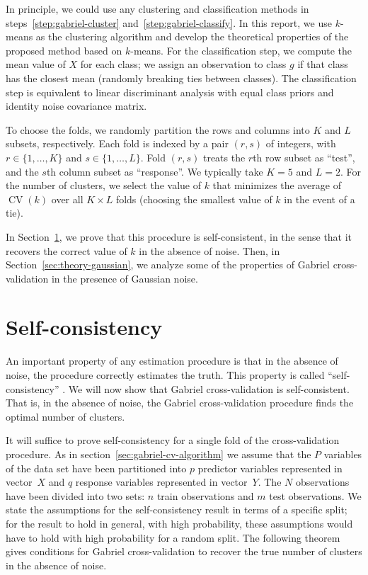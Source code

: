 \documentclass[12pt]{article}
\newcommand{\CV}{\operatorname{CV}}
\begin{document}
\noindent
In principle, we could use any clustering and classification methods in
steps~\ref{step:gabriel-cluster} and~\ref{step:gabriel-classify}.  In this
report, we use $k$-means \citep{hartigan1979algorithm} as the clustering algorithm 
and develop the theoretical properties of the proposed method based on $k$-means. 
For the classification step, we compute the mean value of $X$ for each class; we assign an
observation to class $g$ if that class has the closest mean (randomly breaking
ties between classes).  The classification step is equivalent to linear
discriminant analysis with equal class priors and identity noise covariance
matrix.


To choose the folds, we randomly partition the rows and columns into $K$ and
$L$ subsets, respectively.  Each fold is indexed by a pair $(r,s)$ of
integers, with $r \in \{1, \dotsc, K\}$ and $s \in \{1, \dotsc, L\}$.  Fold
$(r,s)$ treats the $r$th row subset as ``test'', and the $s$th column subset
as ``response''.  We typically take $K = 5$ and $L = 2$.  For the number of
clusters, we select the value of $k$ that minimizes the average of $\CV(k)$
over all $K \times L$ folds (choosing the smallest value of $k$ in the event
of a tie).


In Section~\ref{sec:self-consistent}, we prove that this procedure is
self-consistent, in the sense that it recovers the correct value of $k$ in the
absence of noise. Then, in Section~\ref{sec:theory-gaussian}, we analyze some
of the properties of Gabriel cross-validation in the presence of Gaussian
noise.


\section{Self-consistency}
\label{sec:self-consistent}

An important property of any estimation procedure is that in the absence of
noise, the procedure correctly estimates the truth. This property is called
``self-consistency'' \citep{tarpey96}. We will now show that Gabriel
cross-validation is self-consistent. That is, in the absence of noise, the
Gabriel cross-validation procedure finds the optimal number of clusters.


It will suffice to prove self-consistency for a single fold of the
cross-validation procedure.  As in section~\ref{sec:gabriel-cv-algorithm} we
assume that the $P$ variables of the data set have been partitioned into $p$
predictor variables represented in vector~$X$ and $q$ response variables
represented in vector~$Y$.  The $N$ observations have been divided into two
sets: $n$ train observations and $m$ test observations.  We state the
assumptions for the self-consistency result in terms of a specific split; for
the result to hold in general, with high probability, these assumptions would
have to hold with high probability for a random split. The following theorem
gives conditions for Gabriel cross-validation to recover the true number of
clusters in the absence of noise.
\end{document}
